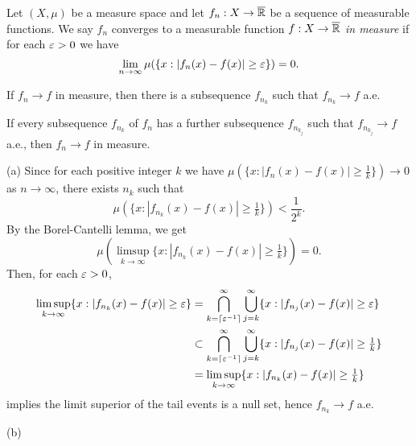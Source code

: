 \documentclass{../../large}
\begin{document}
\begin{prb}
Let $(X,\mu)$ be a measure space and let $f_n:X\to\overline{\mathbb{R}}$ be a sequence of measurable functions.
We say $f_n$ converges to a measurable function $f:X\to\overline{\mathbb{R}}$ \emph{in measure} if for each $\varepsilon>0$ we have
\[\lim_{n\to\infty}\mu(\{x:|f_n(x)-f(x)|\ge\varepsilon\})=0.\]
\begin{parts}
\item If $f_n\to f$ in measure, then there is a subsequence $f_{n_k}$ such that $f_{n_k}\to f$ a.e.
\item If every subsequence $f_{n_k}$ of $f_n$ has a further subsequence $f_{n_{k_j}}$ such that $f_{n_{k_j}}\to f$ a.e., then $f_n\to f$ in measure.
\end{parts}
\end{prb}
\begin{pf}
(a)
Since for each positive integer $k$ we have $\mu(\{x:|f_n(x)-f(x)|\ge\frac1k\})\to0$ as $n\to\infty$, there exists $n_k$ such that
\[\mu(\{x:|f_{n_k}(x)-f(x)|\ge\tfrac1k\})<\frac1{2^k}.\]
By the Borel-Cantelli lemma, we get
\[\mu(\limsup_{k\to\infty}\{x:|f_{n_k}(x)-f(x)|\ge\tfrac1k\})=0.\]
Then, for each $\varepsilon>0$,
\begin{align*}
\limsup_{k\to\infty}\{x:|f_{n_k}(x)-f(x)|\ge\varepsilon\}
&=\bigcap_{k=\lceil\varepsilon^{-1}\rceil}^\infty\bigcup_{j=k}^\infty\{x:|f_{n_j}(x)-f(x)|\ge\varepsilon\}\\
&\subset\bigcap_{k=\lceil\varepsilon^{-1}\rceil}^\infty\bigcup_{j=k}^\infty\{x:|f_{n_j}(x)-f(x)|\ge\tfrac1k\}\\
&=\limsup_{k\to\infty}\{x:|f_{n_k}(x)-f(x)|\ge\tfrac1k\}
\end{align*}
implies the limit superior of the tail events is a null set, hence $f_{n_k}\to f$ a.e.

(b)
\end{pf}
\end{document}
